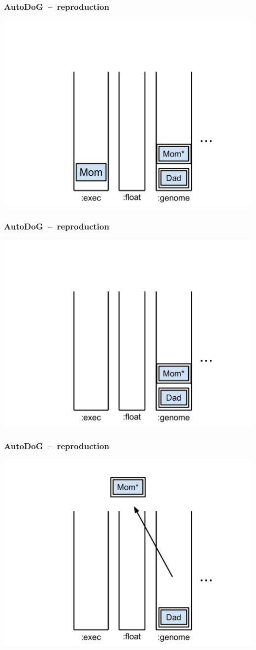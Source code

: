 \documentclass{beamer}
\begin{document}
\begin{frame}
	\frametitle{AutoDoG~--~reproduction}
	\includegraphics[width=.9\textwidth]{Illustrations/autodog_14.PDF}
\end{frame}
\begin{frame}
	\frametitle{AutoDoG~--~reproduction}
	\includegraphics[width=.9\textwidth]{Illustrations/autodog_15.PDF}
\end{frame}

\begin{frame}
	\frametitle{AutoDoG~--~reproduction}
	\includegraphics[width=.9\textwidth]{Illustrations/autodog_16.PDF}
\end{frame}
\end{document}
